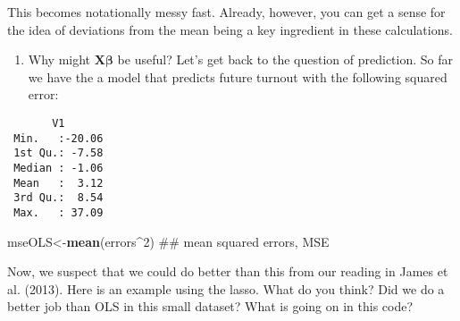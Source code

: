 \documentclass[10pt,]{article}
\newenvironment{Shaded}{\begin{snugshade}}{\end{snugshade}}
\newcommand{\KeywordTok}[1]{\textcolor[rgb]{0.13,0.29,0.53}{\textbf{{#1}}}}
\newcommand{\DataTypeTok}[1]{\textcolor[rgb]{0.13,0.29,0.53}{{#1}}}
\newcommand{\DecValTok}[1]{\textcolor[rgb]{0.00,0.00,0.81}{{#1}}}
\newcommand{\StringTok}[1]{\textcolor[rgb]{0.31,0.60,0.02}{{#1}}}
\newcommand{\NormalTok}[1]{{#1}}
\providecommand{\tightlist}{%
  \setlength{\itemsep}{0pt}\setlength{\parskip}{0pt}}
\begin{document}
This becomes notationally messy fast. Already, however, you can get a
sense for the idea of deviations from the mean being a key ingredient in
these calculations.

\begin{enumerate}
\def\labelenumi{\arabic{enumi}.}
\setcounter{enumi}{6}
\tightlist
\item
  Why might \(\bm{X} \bm{\beta}\) be useful? Let's get back to the
  question of prediction. So far we have the a model that predicts
  future turnout with the following squared error:
\end{enumerate}

\begin{Shaded}
\end{Shaded}

\begin{verbatim}
       V1        
 Min.   :-20.06  
 1st Qu.: -7.58  
 Median : -1.06  
 Mean   :  3.12  
 3rd Qu.:  8.54  
 Max.   : 37.09  
\end{verbatim}

\begin{Shaded}
\begin{Highlighting}[]
\NormalTok{mseOLS<-}\KeywordTok{mean}\NormalTok{(errors^}\DecValTok{2}\NormalTok{) ## mean squared errors, MSE}
\end{Highlighting}
\end{Shaded}

Now, we suspect that we could do better than this from our reading in
James et al. (2013). Here is an example using the lasso. What do you
think? Did we do a better job than OLS in this small dataset? What is
going on in this code?
\end{document}
